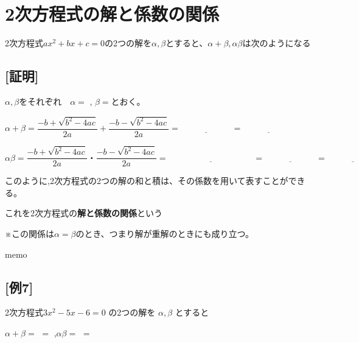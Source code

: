 \documentclass{jsarticle}
\begin{document}
\section*{2次方程式の解と係数の関係}
2次方程式$ax^2+bx+c=0$の2つの解を$\alpha,\beta$とすると、$\alpha + \beta , \alpha\beta$は次のようになる

\subsection*{[証明]}
$\alpha , \beta$をそれぞれ　$\alpha=$ \underline{\hspace{10em}} , $\beta=$\underline{\hspace{10em}}とおく。\par
  \vspace{7mm}
$\alpha + \beta = \dfrac{-b+\sqrt{b^2-4ac}}{2a}+\dfrac{-b-\sqrt{b^2-4ac}}{2a}=\underline{\hspace{6em}}=\underline{\hspace{6em}}$\par
  \vspace{7mm}
$\alpha\beta = \dfrac{-b+\sqrt{b^2-4ac}}{2a}・\dfrac{-b-\sqrt{b^2-4ac}}{2a}=\underline{\hspace{10em}}=\underline{\hspace{6em}}=\underline{\hspace{6em}}$\par
  \vspace{10mm}
このように,2次方程式の2つの解の和と積は、その係数を用いて表すことができる。  \par
これを2次方程式の\textbf{解と係数の関係}という

※この関係は$\alpha=\beta$のとき、つまり解が重解のときにも成り立つ。
\begin{itembox}[l]{memo}
  \vspace{20mm}
\end{itembox}
\subsection*{[例7]}
  2次方程式$3x^2-5x-6=0$ の2つの解を $\alpha,\beta$ とすると\par
  \vspace{8mm}
  $\alpha + \beta = $\underline{\hspace{6em}} $=$ \underline{\hspace{6em}},\qquad$ \alpha\beta = $\underline{\hspace{6em}} $=$ \underline{\hspace{6em}}
\end{document}
